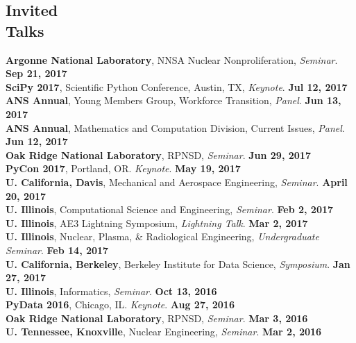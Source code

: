 \documentclass[margin,line]{resume}
\begin{document}
\begin{resume}
    \section{\mysidestyle Invited\\Talks}
    \textbf{Argonne National Laboratory}, NNSA Nuclear Nonproliferation, \emph{Seminar}.  \hfill\textbf{Sep 21, 2017}\\
      \textbf{SciPy 2017}, Scientific Python Conference, Austin, TX, \emph{Keynote}.  \hfill\textbf{Jul 12, 2017}\\
      \textbf{ANS Annual}, Young Members Group, Workforce Transition, \emph{Panel}.  \hfill\textbf{Jun 13, 2017}\\
      \textbf{ANS Annual}, Mathematics and Computation Division, Current Issues, \emph{Panel}.  \hfill\textbf{Jun 12, 2017}\\
      \textbf{Oak Ridge National Laboratory}, RPNSD, \emph{Seminar}.  \hfill\textbf{Jun 29, 2017}\\
      \textbf{PyCon 2017}, Portland, OR. \emph{Keynote}.  \hfill\textbf{May 19, 2017}\\
      \textbf{U. California, Davis}, Mechanical and Aerospace Engineering, \emph{Seminar}.  \hfill\textbf{April 20, 2017}\\
      \textbf{U. Illinois}, Computational Science and Engineering, \emph{Seminar}.  \hfill\textbf{Feb 2, 2017}\\
      \textbf{U. Illinois}, AE3 Lightning Symposium, \emph{Lightning Talk}.  \hfill\textbf{Mar 2, 2017}\\
      \textbf{U. Illinois}, Nuclear, Plasma, \& Radiological Engineering, \emph{Undergraduate Seminar}.  \hfill\textbf{Feb 14, 2017}\\
      \textbf{U. California, Berkeley}, Berkeley Institute for Data Science, \emph{Symposium}.  \hfill\textbf{Jan 27, 2017}\\
      \textbf{U. Illinois}, Informatics, \emph{Seminar}.  \hfill\textbf{Oct 13, 2016}\\
      \textbf{PyData 2016}, Chicago, IL. \emph{Keynote}.  \hfill\textbf{Aug 27, 2016}\\
      \textbf{Oak Ridge National Laboratory}, RPNSD, \emph{Seminar}.  \hfill\textbf{Mar 3, 2016}\\
      \textbf{U. Tennessee, Knoxville}, Nuclear Engineering, \emph{Seminar}.  \hfill\textbf{Mar 2, 2016}\\

\end{resume}
\end{document}
